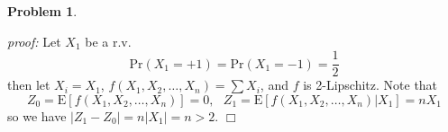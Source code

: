 \documentclass{article}
\newtheorem{problem}[theorem]{Problem}
\newenvironment{solution}{\noindent \textit{proof:}}{$\Box$}
\begin{document}
\begin{problem}
\end{problem}
\begin{solution}
    Let $X_1$ be a r.v.
    $$
    \mathrm{Pr}(X_1 = +1) = \mathrm{Pr}(X_1 = -1) = \frac 1 2
    $$
    then let $X_i = X_1$, $f(X_1, X_2, \dots, X_n) = \sum X_i$, and $f$ is 2-Lipschitz. Note that
    $$
    Z_0 = \mathrm{E}[f(X_1, X_2,\dots, X_n)] = 0, ~~~
    Z_1 = \mathrm{E}[f(X_1, X_2, \dots, X_n)|X_1]=nX_1
    $$
    so we have $|Z_1 - Z_0|=n|X_1|=n>2$.
\end{solution}
\end{document}
